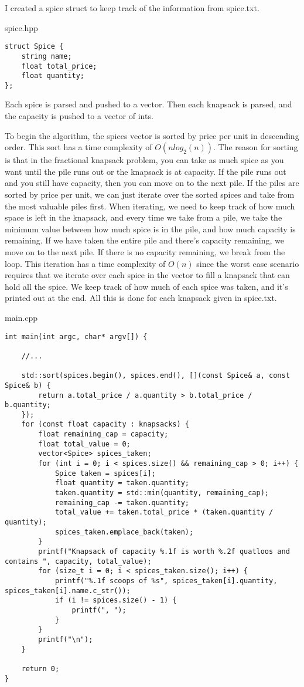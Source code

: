 \documentclass[letterpaper, 10pt,DIV=13]{scrartcl}
\numberwithin{equation}{section} %
\numberwithin{figure}{section} %
\numberwithin{table}{section} %
\begin{document}
I created a spice struct to keep track of the information from spice.txt.

spice.hpp
\begin{verbatim}
struct Spice {
    string name;
    float total_price;
    float quantity;
};
\end{verbatim}

Each spice is parsed and pushed to a vector. Then each knapsack is parsed, and the capacity is pushed to a vector of ints.

To begin the algorithm, the spices vector is sorted by price per unit in descending order. This sort has a time complexity of $O(nlog_2(n))$. The reason for sorting is that in the fractional knapsack problem, you can take as much spice as you want until the pile runs out or the knapsack is at capacity. If the pile runs out and you still have capacity, then you can move on to the next pile. If the piles are sorted by price per unit, we can just iterate over the sorted spices and take from the most valuable piles first. When iterating, we need to keep track of how much space is left in the knapsack, and every time we take from a pile, we take the minimum value between how much spice is in the pile, and how much capacity is remaining. If we have taken the entire pile and there's capacity remaining, we move on to the next pile. If there is no capacity remaining, we break from the loop. This iteration has a time complexity of $O(n)$ since the worst case scenario requires that we iterate over each spice in the vector to fill a knapsack that can hold all the spice. We keep track of how much of each spice was taken, and it's printed out at the end. All this is done for each knapsack given in spice.txt.

main.cpp
\begin{verbatim}
int main(int argc, char* argv[]) {

    //...

    std::sort(spices.begin(), spices.end(), [](const Spice& a, const Spice& b) {
        return a.total_price / a.quantity > b.total_price / b.quantity;
    });
    for (const float capacity : knapsacks) {
        float remaining_cap = capacity;
        float total_value = 0;
        vector<Spice> spices_taken;
        for (int i = 0; i < spices.size() && remaining_cap > 0; i++) {
            Spice taken = spices[i];
            float quantity = taken.quantity;
            taken.quantity = std::min(quantity, remaining_cap);
            remaining_cap -= taken.quantity;
            total_value += taken.total_price * (taken.quantity / quantity);
            spices_taken.emplace_back(taken);
        }
        printf("Knapsack of capacity %.1f is worth %.2f quatloos and contains ", capacity, total_value);
        for (size_t i = 0; i < spices_taken.size(); i++) {
            printf("%.1f scoops of %s", spices_taken[i].quantity, spices_taken[i].name.c_str());
            if (i != spices.size() - 1) {
                printf(", ");
            }
        }
        printf("\n");
    }

    return 0;
}
\end{verbatim}
\end{document}
